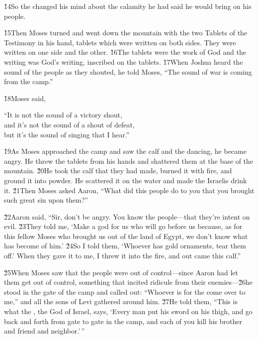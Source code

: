\v{14}So the  changed his mind about the calamity he had said he would bring on his people.

\v{15}Then Moses turned and went down the mountain with the two Tablets of the Testimony in his hand, tablets which were written on both sides. They were written on one side and the other. \v{16}The tablets were the work of God and the writing was God's writing, inscribed on the tablets. \v{17}When Joshua heard the sound of the people as they shouted, he told Moses, ``The sound of war is coming from the camp.''

\v{18}Moses said,

\begin{poetry}
\poeml ``It is not the sound of a victory shout, \\
\poemll    and it's not the sound of a shout of defeat, \\
\poemlll       but it's the sound of singing that I hear.''
\end{poetry}

\v{19}As Moses approached the camp and saw the calf and the dancing, he became angry. He threw the tablets from his hands and shattered them at the base of the mountain. \v{20}He took the calf that they had made, burned it with fire, and ground it into powder. He scattered it on the water and made the Israelis drink it. \v{21}Then Moses asked Aaron, ``What did this people do to you that you brought such great sin upon them?''

\v{22}Aaron said, ``Sir, don't be angry. You know the people---that they're intent on evil. \v{23}They told me, `Make a god for us who will go before us because, as for this fellow Moses who brought us out of the land of Egypt, we don't know what has become of him.' \v{24}So I told them, `Whoever has gold ornaments, tear them off.' When they gave it to me, I threw it into the fire, and out came this calf.''

\v{25}When Moses saw that the people were out of control---since Aaron had let them get out of control, something that incited ridicule from their enemies---\v{26}he stood in the gate of the camp and called out: ``Whoever is for the  come over to me,'' and all the sons of Levi gathered around him. \v{27}He told them, ``This is what the , the God of Israel, says, `Every man put his sword on his thigh, and go back and forth from gate to gate in the camp, and each of you kill his brother and friend and neighbor.'\,''

